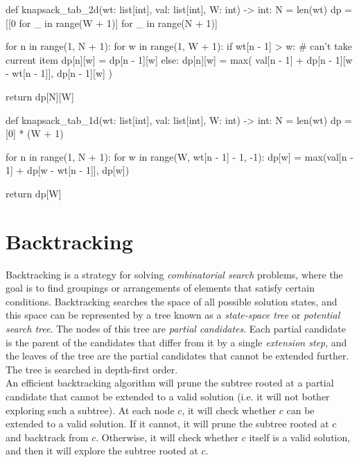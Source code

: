 \documentclass[12pt, titlepage]{article}
\begin{document}
\begin{python}
def knapsack_tab_2d(wt: list[int], val: list[int], W: int) -> int:
    N = len(wt)
    dp = [[0 for _ in range(W + 1)] for _ in range(N + 1)]

    for n in range(1, N + 1):
        for w in range(1, W + 1):
            if wt[n - 1] > w:  # can't take current item
                dp[n][w] = dp[n - 1][w]
            else:
                dp[n][w] = max(
                    val[n - 1] + dp[n - 1][w - wt[n - 1]],
                    dp[n - 1][w]
                )

    return dp[N][W]
\end{python}

\begin{python}
def knapsack_tab_1d(wt: list[int], val: list[int], W: int) -> int:
    N = len(wt)
    dp = [0] * (W + 1)

    for n in range(1, N + 1):
        for w in range(W, wt[n - 1] - 1, -1):
            dp[w] = max(val[n - 1] + dp[w - wt[n - 1]], dp[w])

    return dp[W]
\end{python}

\section{Backtracking}

Backtracking is a strategy for solving \textit{combinatorial search} problems, where the goal is to find groupings or arrangements of elements that satisfy certain conditions. Backtracking searches the space of all possible solution states, and this space can be represented by a tree known as a \textit{state-space tree} or \textit{potential search tree}. The nodes of this tree are \textit{partial candidates}. Each partial candidate is the parent of the candidates that differ from it by a single \textit{extension step}, and the leaves of the tree are the partial candidates that cannot be extended further. The tree is searched in depth-first order. \\

An efficient backtracking algorithm will prune the subtree rooted at a partial candidate that cannot be extended to a valid solution (i.e. it will not bother exploring such a subtree). At each node $c$, it will check whether $c$ can be extended to a valid solution. If it cannot, it will prune the subtree rooted at $c$ and backtrack from $c$. Otherwise, it will check whether $c$ itself is a valid solution, and then it will explore the subtree rooted at $c$. \\
\end{document}
